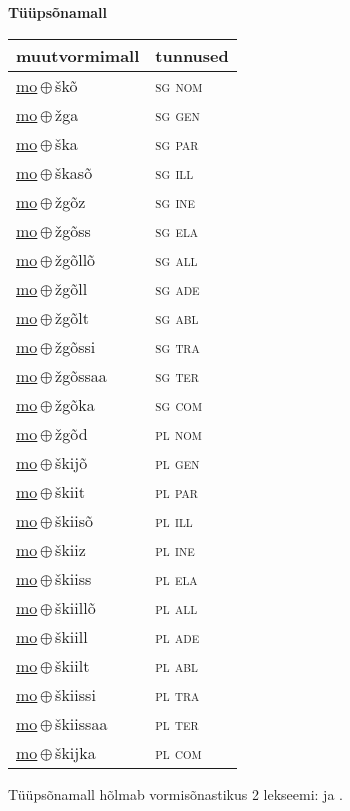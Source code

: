 

\vspace{3.5em}
\noindent \begin{minipage}{\textwidth}
\noindent \textbf{Tüüpsõnamall \,}\\

\begin{sideways}
\begin{tabular}{l l}
muutvormimall & tunnused \\
\hline
\underline{mo}\,$\oplus$\,škõ & \textsc{ sg nom } \\
\underline{mo}\,$\oplus$\,žga & \textsc{ sg gen } \\
\underline{mo}\,$\oplus$\,ška & \textsc{ sg par } \\
\underline{mo}\,$\oplus$\,škasõ & \textsc{ sg ill } \\
\underline{mo}\,$\oplus$\,žgõz & \textsc{ sg ine } \\
\underline{mo}\,$\oplus$\,žgõss & \textsc{ sg ela } \\
\underline{mo}\,$\oplus$\,žgõllõ & \textsc{ sg all } \\
\underline{mo}\,$\oplus$\,žgõll & \textsc{ sg ade } \\
\underline{mo}\,$\oplus$\,žgõlt & \textsc{ sg abl } \\
\underline{mo}\,$\oplus$\,žgõssi & \textsc{ sg tra } \\
\underline{mo}\,$\oplus$\,žgõssaa & \textsc{ sg ter } \\
\underline{mo}\,$\oplus$\,žgõka & \textsc{ sg com } \\
\underline{mo}\,$\oplus$\,žgõd & \textsc{ pl nom } \\
\underline{mo}\,$\oplus$\,škijõ & \textsc{ pl gen } \\
\underline{mo}\,$\oplus$\,škiit & \textsc{ pl par } \\
\underline{mo}\,$\oplus$\,škiisõ & \textsc{ pl ill } \\
\underline{mo}\,$\oplus$\,škiiz & \textsc{ pl ine } \\
\underline{mo}\,$\oplus$\,škiiss & \textsc{ pl ela } \\
\underline{mo}\,$\oplus$\,škiillõ & \textsc{ pl all } \\
\underline{mo}\,$\oplus$\,škiill & \textsc{ pl ade } \\
\underline{mo}\,$\oplus$\,škiilt & \textsc{ pl abl } \\
\underline{mo}\,$\oplus$\,škiissi & \textsc{ pl tra } \\
\underline{mo}\,$\oplus$\,škiissaa & \textsc{ pl ter } \\
\underline{mo}\,$\oplus$\,škijka & \textsc{ pl com } \\
\end{tabular}
\end{sideways}
\label{tab:tüüpsõnamall-moškõ}

\end{minipage}

 
\vspace{1em}
\noindent Tüüpsõnamall  hõlmab vormisõnastikus 2 lekseemi:  ja .
